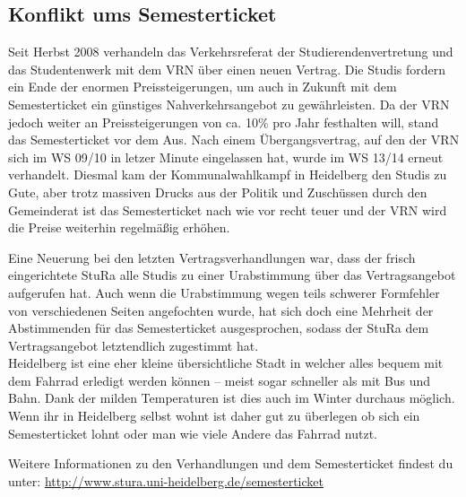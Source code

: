 \subsection{Konflikt ums Semesterticket}
Seit Herbst 2008 verhandeln das Verkehrsreferat der Studierendenvertretung und das Studentenwerk mit dem VRN über einen neuen Vertrag. Die Studis fordern ein Ende der enormen Preissteigerungen, um auch in Zukunft mit dem Semesterticket ein günstiges Nahverkehrsangebot zu gewährleisten. Da der VRN jedoch weiter an Preissteigerungen von ca. 10\% pro Jahr festhalten will, stand das Semesterticket vor dem Aus. 
Nach einem Übergangsvertrag, auf den der VRN sich im WS 09/10 in letzer Minute eingelassen hat, wurde im WS 13/14 erneut verhandelt. Diesmal kam der Kommunalwahlkampf in Heidelberg den Studis zu Gute, aber trotz massiven Drucks aus der Politik und Zuschüssen durch den Gemeinderat ist das Semesterticket nach wie vor recht teuer und der VRN wird die Preise weiterhin regelmäßig erhöhen.

Eine Neuerung bei den letzten Vertragsverhandlungen war, dass der frisch eingerichtete \gls{StuRa} alle Studis zu einer Urabstimmung über das Vertragsangebot aufgerufen hat. Auch wenn die Urabstimmung wegen teils schwerer Formfehler von verschiedenen Seiten angefochten wurde, hat sich doch eine Mehrheit der Abstimmenden für das Semesterticket ausgesprochen, sodass der StuRa dem Vertragsangebot letztendlich zugestimmt hat.\\[1em]

Heidelberg ist eine eher kleine übersichtliche Stadt in welcher alles bequem mit dem Fahrrad erledigt werden können -- meist sogar schneller als mit Bus und Bahn. Dank der milden Temperaturen ist dies auch im Winter durchaus möglich. Wenn ihr in Heidelberg selbst wohnt ist daher gut zu überlegen ob sich ein Semesterticket lohnt oder man wie viele Andere das Fahrrad nutzt.

Weitere Informationen zu den Verhandlungen und dem Semesterticket findest du unter: \url{http://www.stura.uni-heidelberg.de/semesterticket}



